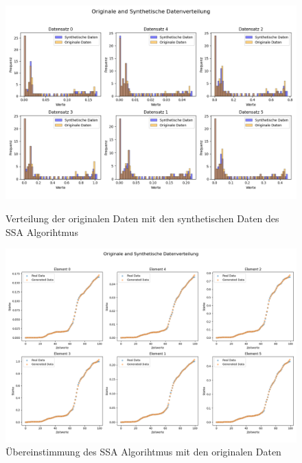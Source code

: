 \begin{figure}[ht]
    \centering
    \begin{minipage}{0.5\textwidth}
        \centering
        \includegraphics[width=\textwidth]{includes/figures/graphs/corona_histogram_tsa.png}
        \caption{Verteilung der originalen Daten mit den synthetischen Daten des SSA Algorihtmus}
        \label{fig:graphs_ssa_histogram}
    \end{minipage}\hfill
    \begin{minipage}{0.5\textwidth}
        \centering
        \includegraphics[width=\textwidth]{includes/figures/graphs/corona_histogram_tsa_compare.png}
        \caption{Übereinstimmung des SSA Algorihtmus mit den originalen Daten}
        \label{fig:graphs_ssa_histogram_compare}
    \end{minipage}
\end{figure}




